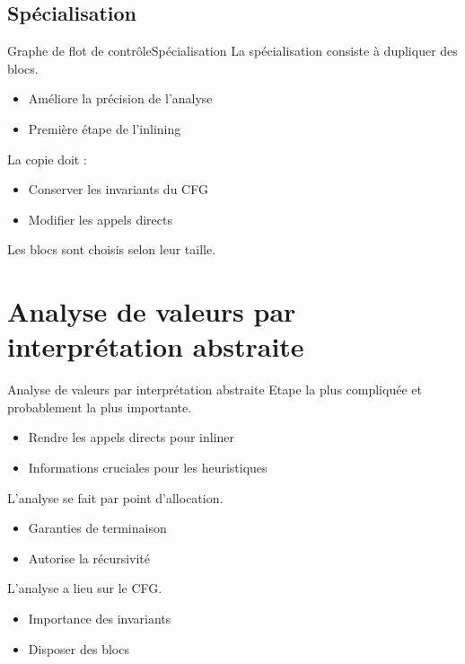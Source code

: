 \documentclass{beamer}
\begin{document}
\subsection{Spécialisation}

\begin{frame}{Graphe de flot de contrôle}{Spécialisation}
    La spécialisation consiste à dupliquer des blocs.

    \begin{itemize}
        \item Améliore la précision de l'analyse
        \item Première étape de l'inlining
    \end{itemize}

    La copie doit :

    \begin{itemize}
        \item Conserver les invariants du CFG
        \item Modifier les appels directs
    \end{itemize}

    Les blocs sont choisis selon leur taille.
\end{frame}

\section{Analyse de valeurs par interprétation abstraite}

\begin{frame}{Analyse de valeurs par interprétation abstraite}
    Etape la plus compliquée et probablement la plus importante.
    \begin{itemize}
        \item Rendre les appels directs pour inliner
        \item Informations cruciales pour les heuristiques
    \end{itemize}

    L'analyse se fait par point d'allocation.
    \begin{itemize}
        \item Garanties de terminaison
        \item Autorise la récursivité
    \end{itemize}

    L'analyse a lieu sur le CFG.
    \begin{itemize}
        \item Importance des invariants
        \item Disposer des blocs
    \end{itemize}
\end{frame}
\end{document}
